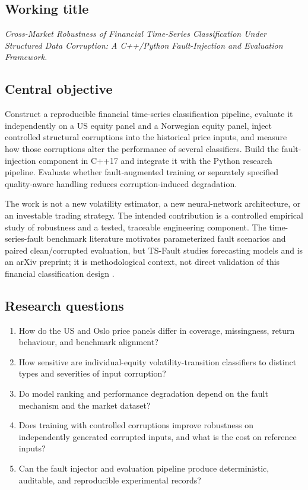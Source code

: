 \documentclass[11pt,a4paper]{article}
\begin{document}
\subsection{Working title}

\emph{Cross-Market Robustness of Financial Time-Series Classification Under Structured Data Corruption: A C++/Python Fault-Injection and Evaluation Framework.}

\subsection{Central objective}

\begin{decisionbox}
Construct a reproducible financial time-series classification pipeline, evaluate it independently on a US equity panel and a Norwegian equity panel, inject controlled structural corruptions into the historical price inputs, and measure how those corruptions alter the performance of several classifiers. Build the fault-injection component in C++17 and integrate it with the Python research pipeline. Evaluate whether fault-augmented training or separately specified quality-aware handling reduces corruption-induced degradation.
\end{decisionbox}

The work is not a new volatility estimator, a new neural-network architecture, or an investable trading strategy. The intended contribution is a controlled empirical study of robustness and a tested, traceable engineering component. The time-series-fault benchmark literature motivates parameterized fault scenarios and paired clean/corrupted evaluation, but TS-Fault studies forecasting models and is an arXiv preprint; it is methodological context, not direct validation of this financial classification design \cite{Zhao2026TSFault}.

\subsection{Research questions}

\begin{enumerate}[label=RQ\arabic*:,leftmargin=2.1cm]
  \item How do the US and Oslo price panels differ in coverage, missingness, return behaviour, and benchmark alignment?
  \item How sensitive are individual-equity volatility-transition classifiers to distinct types and severities of input corruption?
  \item Do model ranking and performance degradation depend on the fault mechanism and the market dataset?
  \item Does training with controlled corruptions improve robustness on independently generated corrupted inputs, and what is the cost on reference inputs?
  \item Can the fault injector and evaluation pipeline produce deterministic, auditable, and reproducible experimental records?
\end{enumerate}
\end{document}
